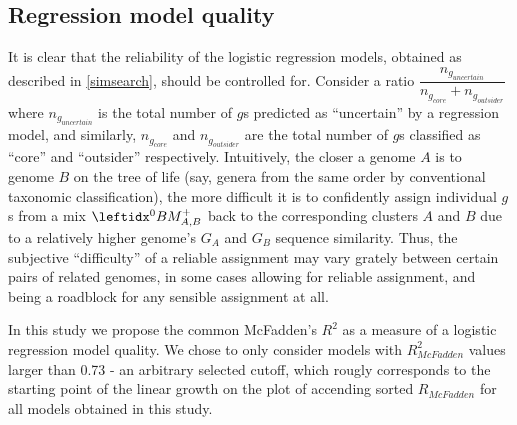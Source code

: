 \subsection{Regression model quality} It is clear that the reliability of the
logistic regression models, obtained as described in \ref{simsearch}, should be
controlled for. Consider a ratio
$\dfrac{n_{g_{uncertain}}}{n_{g_{core}}+n_{g_{outsider}}}$ where
$n_{g_{uncertain}}$ is the total number of $g$s predicted as ``uncertain'' by a
regression model, and similarly, $n_{g_{core}}$ and $n_{g_{outsider}}$ are the
total number of $g$s classified as ``core'' and ``outsider'' respectively.
Intuitively, the closer a genome $A$ is to genome $B$ on the tree of life (say,
genera from the same order by conventional taxonomic classification), the more
difficult it is to confidently assign individual $g$s from a mix $\bmzpab$ back
to the corresponding clusters $A$ and $B$ due to a relatively higher genome's
$G_A$ and $G_B$ sequence similarity. Thus, the subjective ``difficulty'' of a
reliable assignment may vary grately between certain pairs of related genomes,
in some cases allowing for reliable assignment, and being a roadblock for any
sensible assignment at all.

In this study we propose the common McFadden's $R^2$ \cite{McFadden1974} as a
measure of a logistic regression model quality. We chose to only consider
models with $R_{McFadden}^2$ values larger than 0.73 - an arbitrary selected
cutoff, which rougly corresponds to the starting point of the linear growth on
the plot of accending sorted $R_{McFadden}$ for all models obtained in this
study.
